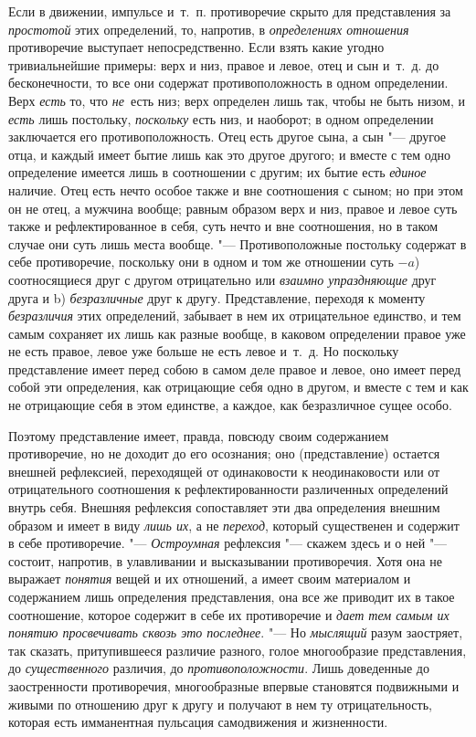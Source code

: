 Если в движении, импульсе и~т.~п. противоречие скрыто для представления за
{\em простотой} этих определений, то, напротив, в
{\em определениях отношения} противоречие выступает
непосредственно. Если взять какие угодно тривиальнейшие примеры: верх и
низ, правое и левое, отец и сын и~т.~д. до бесконечности, то все они
содержат противоположность в одном определении. Верх
{\em есть} то, что {\em не}~есть
низ; верх определен лишь так, чтобы не быть низом, и
{\em есть} лишь постольку, {\em поскольку} есть низ, и наоборот; в одном
определении заключается его противоположность. Отец есть другое сына, а сын
"--- другое отца, и каждый имеет бытие лишь как это другое другого; и вместе с
тем одно определение имеется лишь в соотношении с другим; их бытие есть
{\em единое} наличие. Отец есть нечто особое также и
вне соотношения с сыном; но при этом он не отец, а мужчина вообще; равным
образом верх и низ, правое и левое суть также и рефлектированное в себя,
суть нечто и вне соотношения, но в таком случае они суть лишь места вообще.
"--- Противоположные постольку содержат в себе противоречие, поскольку они в
одном и том же отношении суть $-a$) соотносящиеся
друг с другом отрицательно или {\em взаимно
упраздняющие} друг друга и b) {\em безразличные} друг к
другу. Представление, переходя к моменту
{\em безразличия} этих определений, забывает в нем их
отрицательное единство, и тем самым сохраняет их лишь как разные вообще, в
каковом определении правое уже не есть правое, левое уже больше не есть
левое и~т.~д. Но поскольку представление имеет перед собою в самом деле
правое и левое, оно имеет перед собой эти определения, как отрицающие себя
одно в другом, и вместе с тем и как не отрицающие себя в этом единстве, а
каждое, как безразличное сущее особо.

Поэтому представление имеет, правда, повсюду своим содержанием противоречие,
но не доходит до его осознания; оно (представление) остается внешней
рефлексией, переходящей от одинаковости к неодинаковости или от
отрицательного соотношения к рефлектированности различенных определений
внутрь себя. Внешняя рефлексия сопоставляет эти два определения внешним
образом и имеет в виду {\em лишь их}, а не
{\em переход}, который существенен и содержит в себе
противоречие. "--- {\em Остроумная} рефлексия "--- скажем
здесь и о ней "--- состоит, напротив, в улавливании и высказывании
противоречия. Хотя она не выражает {\em понятия} вещей
и их отношений, а имеет своим материалом и содержанием лишь определения
представления, она все же приводит их в такое соотношение, которое содержит
в себе их противоречие и {\em дает тем самым их понятию
просвечивать сквозь это последнее}. "--- Но {\em мыслящий}
разум заостряет, так сказать, притупившееся различие разного, голое
многообразие представления, до {\em существенного}
различия, до {\em противоположности}. Лишь доведенные
до заостренности противоречия, многообразные впервые становятся подвижными
и живыми по отношению друг к другу и получают в нем ту отрицательность,
которая есть имманентная пульсация самодвижения и жизненности.

